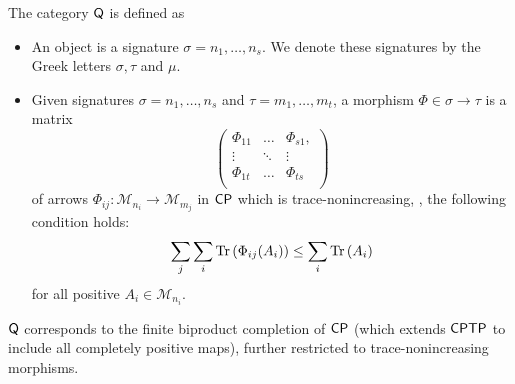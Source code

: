 \begin{definition} \label{def:catQ}
  The category $\mathsf{Q}$ is defined as 
  \begin{itemize}
    \item An object is a signature $\sigma= n_1, \ldots, n_s$. We denote these signatures by the Greek letters $\sigma, \tau$ and $\mu$.
    \item  Given signatures  $\sigma = n_1, \ldots, n_s $ and $\tau= m_1, \ldots, m_t $, a morphism $\Phi \in \sigma \to \tau $ is a matrix
    $$\begin{pmatrix}
      \Phi_{11} & \ldots & \Phi_{s1}, \\
      \vdots & \ddots  & \vdots \\
      \Phi_{1t} & \ldots & \Phi_{ts} \\
    \end{pmatrix}$$
    of arrows $\Phi_{ij}: \mathcal{M}_{n_i} \rightarrow \mathcal{M}_{m_j}$ in $\mathsf{CP}$ which is trace-nonincreasing, \ie, the following condition holds:
    $$ \sum_j \sum_i \text{Tr} \left(\Phi_{ij} (A_i)\right)   \leq  \sum_i \text{Tr} \left(A_i\right) $$
   for all positive $A_i \in \mathcal{M}_{n_i}$.

  \end{itemize}
\end{definition}

\begin{remark}
  $\mathsf{Q}$ corresponds to the finite biproduct completion of $\mathsf{CP}$ (which extends $\mathsf{CPTP}$ to include all completely positive maps),  further restricted to trace-nonincreasing morphisms. 
\end{remark}

